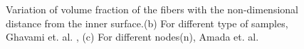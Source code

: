 \documentclass[openright,twoside]{iitkthesis}
\begin{document}
\begin{figure}[H]
\begin{center}
     \vfill
\caption{Variation of volume fraction of the fibers with the non-dimensional distance from the inner surface.(b) For different type of samples, Ghavami et. al. \cite{ghavami2003bamboo}, (c) For different nodes(n), Amada et. al. \cite{amada1996mechanical} }
\label{fig:radial}
\end{center}
\end{figure}
\end{document}
